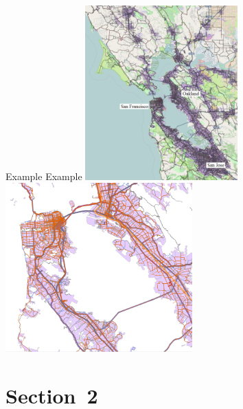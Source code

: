 \createfigure%
{Example}%
{Example}%
{\label{fig:example}}%
{%
 \createsubfigure%
 {}
 {\includegraphics[width=0.44\textwidth, angle=0]{./scenarios/figures/sf_fig1_left.png}}
 {\label{fig:sf_fig1_left}}
\createsubfigure%
 {}
 {\includegraphics[width=0.54\textwidth, angle=0]{./scenarios/figures/sf_fig1_right.png}}
 {\label{fig:sf_fig1_right}}
}%
{}
\section{Section~2}





